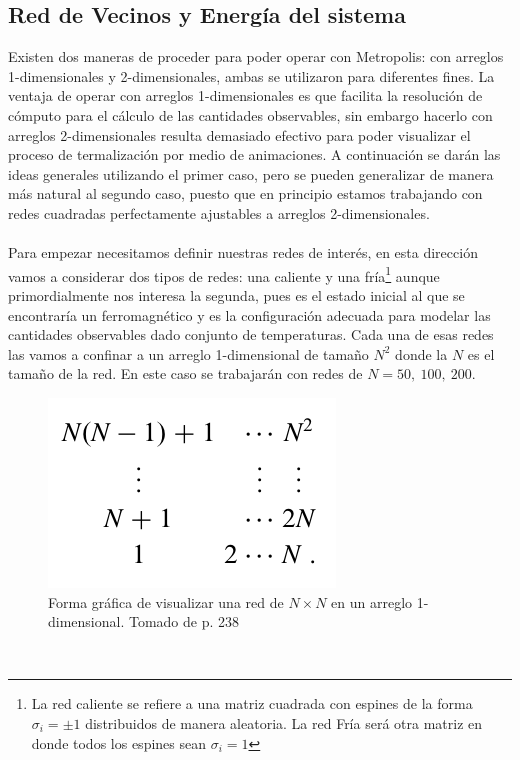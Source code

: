 \documentclass[11pt,a4paper]{article}
\begin{document}
\subsection{Red de Vecinos y Energía del sistema}

Existen dos maneras de proceder para poder operar con Metropolis: con arreglos 1-dimensionales y 2-dimensionales, ambas se utilizaron para diferentes fines. La ventaja de operar con arreglos 1-dimensionales es que facilita la resolución de cómputo para el cálculo de las cantidades observables, sin embargo hacerlo con arreglos 2-dimensionales resulta demasiado efectivo para poder visualizar el proceso de termalización por medio de animaciones. A continuación se darán las ideas generales utilizando el primer caso, pero se pueden generalizar de manera más natural al segundo caso, puesto que en principio estamos trabajando con redes cuadradas perfectamente ajustables a arreglos 2-dimensionales.\\
\\
Para empezar necesitamos definir nuestras redes de interés, en esta dirección vamos a considerar dos tipos de redes: una caliente y una fría\footnote{La red caliente se refiere a una matriz cuadrada con espines de la forma $\sigma_i=\pm1$ distribuidos de manera aleatoria. La red Fría será otra matriz en donde todos los espines sean $\sigma_i=1$ } aunque primordialmente nos interesa la segunda, pues es el estado inicial al que se encontraría un ferromagnético y es la configuración adecuada para modelar las cantidades observables dado conjunto de temperaturas. Cada una de esas redes las vamos a confinar a un arreglo 1-dimensional de tamaño $N^2$ donde la $N$ es el tamaño de la red. En este caso se trabajarán con redes de $N=50,\ 100,\ 200$.
\begin{figure}[h!]
\centering
\includegraphics[scale=0.345]{arreglo1d}
\caption{Forma gráfica de visualizar una red de $N\times N$ en un arreglo 1-dimensional. Tomado de \cite{stickler} p. 238}
\end{figure}
\\
\end{document}
